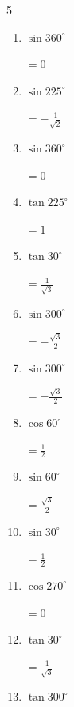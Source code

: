 \begin{multicols}{5}
\begin{enumerate}
        $\displaystyle =1$

  \item $\displaystyle \sin{360^\circ}$

        $\displaystyle =0$

  \item $\displaystyle \sin{225^\circ}$

        $\displaystyle =-\frac{1}{\sqrt{2}}$

  \item $\displaystyle \sin{360^\circ}$

        $\displaystyle =0$

  \item $\displaystyle \tan{225^\circ}$

        $\displaystyle =1$

  \item $\displaystyle \tan{30^\circ}$

        $\displaystyle =\frac{1}{\sqrt{3}}$

  \item $\displaystyle \sin{300^\circ}$

        $\displaystyle =-\frac{\sqrt{3}}{2}$

  \item $\displaystyle \sin{300^\circ}$

        $\displaystyle =-\frac{\sqrt{3}}{2}$

  \item $\displaystyle \cos{60^\circ}$

        $\displaystyle =\frac{1}{2}$

  \item $\displaystyle \sin{60^\circ}$

        $\displaystyle =\frac{\sqrt{3}}{2}$

\columnbreak %

  \item $\displaystyle \sin{30^\circ}$

        $\displaystyle =\frac{1}{2}$

  \item $\displaystyle \cos{270^\circ}$

        $\displaystyle =0$

  \item $\displaystyle \tan{30^\circ}$

        $\displaystyle =\frac{1}{\sqrt{3}}$

  \item $\displaystyle \tan{300^\circ}$


\end{enumerate}
\end{multicols}
